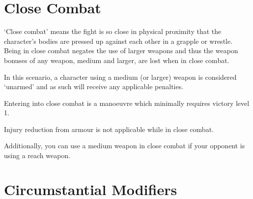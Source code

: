 \section{Close Combat}

‘Close combat’ means the fight is so close in physical proximity that the character’s bodies are pressed up against each other in a grapple or wrestle. Being in close combat negates the use of larger weapons and thus the weapon bonuses of any weapon, medium and larger, are lost when in close combat.

In this scenario, a character using a medium (or larger) weapon is considered ‘unarmed’ and as such will receive any applicable penalties.

Entering into close combat is a manoeuvre which minimally requires victory level 1.

Injury reduction from armour is not applicable while in close combat.

Additionally, you can use a medium weapon in close combat if your opponent is using a reach weapon.

\section{Circumstantial Modifiers}

